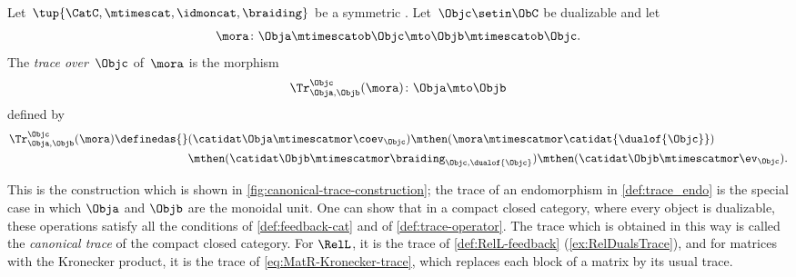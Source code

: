 \begin{ctdefinition}
    \label{def:trace_gen_endo}
    Let~$\tup{\CatC, \mtimescat, \idmoncat, \braiding}$ be a symmetric .
    Let~$\Objc \setin \ObC$ be dualizable and let
    \begin{equation}
        \mora \colon \Obja \mtimescatob \Objc \mto \Objb \mtimescatob \Objc.
    \end{equation}
    The \emph{trace over}~$\Objc$ of~$\mora$ is the morphism
    \begin{equation}
        \Tr_{\Obja, \Objb}^\Objc (\mora) \colon \Obja \mto \Objb
    \end{equation}
    defined by
    \begin{equation}
        \label{eq:endo_trace_gen}
        \begin{aligned}
            \Tr_{\Obja, \Objb}^\Objc (\mora) \definedas {}
             & (\catidat\Obja \mtimescatmor \coev_\Objc)
            \mthen (\mora \mtimescatmor \catidat{\dualof{\Objc}}) \\
             & \mthen (\catidat\Objb \mtimescatmor \braiding_{\Objc,\dualof{\Objc}})
            \mthen (\catidat\Objb \mtimescatmor \ev_\Objc).
        \end{aligned}
    \end{equation}
\end{ctdefinition}

This is the construction which is shown in \cref{fig:canonical-trace-construction}; the trace of an endomorphism in \cref{def:trace_endo} is the special case in which $\Obja$ and $\Objb$ are the monoidal unit.
One can show that in a compact closed category, where every object is dualizable, these operations satisfy all the conditions of \cref{def:feedback-cat} and of \cref{def:trace-operator}.
The trace which is obtained in this way is called the \emph{canonical trace} of the compact closed category.
For $\RelL$, it is the trace of \cref{def:RelL-feedback} (\cref{ex:RelDualsTrace}), and for matrices with the Kronecker product, it is the trace of \cref{eq:MatR-Kronecker-trace}, which replaces each block of a matrix by its usual trace.

